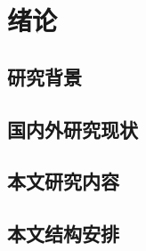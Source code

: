 
\chapter{绪论}
\label{cha:introduction}

\imageplaceholder

\cite{Kingma2014AdamAM}

\section{研究背景}
\label{sec:background}

\section{国内外研究现状}
\label{sec:related_works}

\section{本文研究内容}
\label{sec:thesis_target}

\section{本文结构安排}
\label{sec:thesis_structure}
